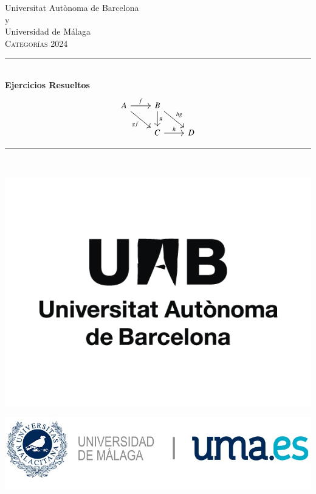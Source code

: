 \documentclass[12pt, a4paper]{article}
\begin{document}
\begin{titlepage}
\center
\vspace*{\fill}

\Large Universitat Aut\`onoma de Barcelona\\%
\Large y\\
\Large Universidad de Málaga\\[1.5cm] %
\textsc{\Large Categorías 2024}\\[0.5cm] %

\rule{\linewidth}{0.5mm} \\[0.4cm]
{ \huge \bfseries Ejercicios Resueltos}\\[-0.8cm]
\[
\begin{tikzcd}
  A \arrow[r,"f"] \arrow[dr,"gf"swap] & B \arrow[d,"g"] \arrow[dr,"hg"]  \\
& C \arrow[r,"h"] & D
\end{tikzcd}
\]
\rule{\linewidth}{0.5mm} \\[1.5cm]

 



\vspace*{\fill}

\includegraphics[scale=0.25]{Logo_UAB.png}

\vspace*{\fill}

\vspace*{\fill}

\includegraphics[scale=0.25]{Logo_UMA.jpg}

\vspace*{\fill}
\end{titlepage}




\end{document}
